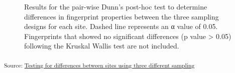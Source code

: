 \documentclass[
  number]{elsarticle}
\begin{document}
\begin{figure}[H]


\caption{\label{fig-dunns-test}Results for the pair-wise Dunn's post-hoc
test to determine differences in fingerprint properties between the
three sampling designs for each site. Dashed line represents an α value
of 0.05. Fingerprints that showed no significant differences (p value
\textgreater{} 0.05) following the Kruskal Wallis test are not
included.}

\end{figure}%

\textsubscript{Source:
\href{https://alex-koiter.github.io/sampling-design-manuscript/notebooks/kruskal-preview.html\#cell-fig-dunns-test}{Testing
for differences between sites using three different sampling}}
\end{document}
